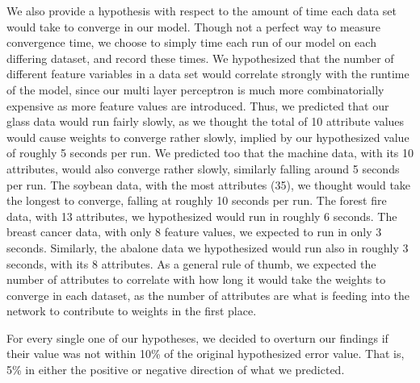 \documentclass[twoside,11pt]{article}
\begin{document}
  We also provide a hypothesis with respect to the amount of time each data set would take to converge in our model. Though not a perfect way to measure
  convergence time, we choose to simply time each run of our model on each differing dataset, and record these times. We hypothesized that the number of
  different feature variables in a data set would correlate strongly with the runtime of the model, since our multi layer perceptron is much more 
  combinatorially expensive as more feature values are introduced. Thus, we predicted that our glass data would run fairly slowly, as we thought the total of
  10 attribute values would cause weights to converge rather slowly, implied by our hypothesized value of roughly 5 seconds per run.
  We predicted too that the machine data, with its 10 attributes, would also converge rather slowly, similarly falling around 5 seconds per run. The
  soybean data, with the most attributes (35), we thought would take the longest to converge, falling at roughly 10 seconds per run. The forest fire data,
  with 13 attributes, we hypothesized would run in roughly 6 seconds. The breast cancer data, with only 8 feature values, we expected to run in only 3 seconds.
  Similarly, the abalone data we hypothesized would run also in roughly 3 seconds, with its 8 attributes. As a general rule of thumb, we expected the number of
  attributes to correlate with how long it would take the weights to converge in each dataset, as the number of attributes are what is feeding into the network
  to contribute to weights in the first place.

  For every single one of our hypotheses, we decided to overturn our findings if their value was not within 10\% of the original hypothesized error value. 
  That is, 5\% in either the positive or negative direction of what we predicted.
\end{document}
